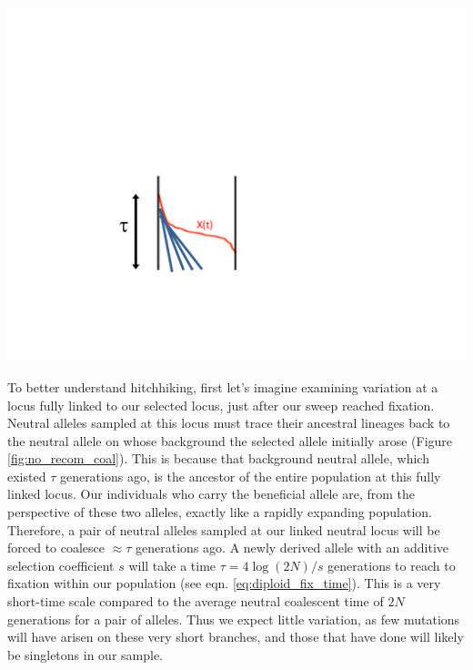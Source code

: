 \begin{marginfigure}
\begin{center}
\includegraphics[width= 0.75 \textwidth]{figures/Hitchhiking/No_recom_coal.pdf}
\end{center}
\caption{} \label{fig:no_recom_coal}
\end{marginfigure}
To better understand hitchhiking, first let's imagine examining variation at a locus fully linked
to our selected locus, just after our sweep reached fixation. Neutral alleles sampled at this locus
must trace their ancestral lineages back to the neutral
allele on whose background the selected allele initially arose (Figure
\ref{fig:no_recom_coal}). This is because
that background neutral allele, which existed $\tau$ generations ago, is the
ancestor of the entire population at this fully linked locus. Our individuals who
carry the beneficial allele are, from the perspective of these two
alleles, exactly like a rapidly expanding population. Therefore, a
pair of neutral alleles sampled at our linked neutral locus will be forced to
coalesce $\approx \tau$ generations ago. A newly derived allele with an additive selection coefficient $s$ will
take a time $\tau = 4\log(2N)/s$ generations to reach to fixation
within our population (see eqn. \eqref{eq:diploid_fix_time}). This is a very
short-time scale compared to the average neutral coalescent time of
$2N$ generations for a pair of alleles. Thus we expect little variation,
as few mutations will have arisen on these very short branches, and
those that have done will likely be singletons in our sample. \\

